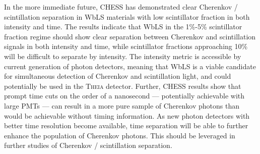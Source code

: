 In the more immediate future, CHESS has demonstrated clear Cherenkov / scintillation separation in WbLS materials with low scintillator fraction in both intensity and time. 
The results indicate that WbLS in the 1\%-5\% scintillator fraction regime should show clear separation between Cherenkov and scintillation signals in both intensity and time, while scintillator fractions approaching 10\% will be difficult to separate by intensity.
The intensity metric is accessible by current generation of photon detectors, meaning that WbLS is a viable candidate for simultaneous detection of Cherenkov and scintillation light, and could potentially be used in the \textsc{Theia} detector.
Further, CHESS results show that prompt time cuts on the order of a nanosecond --- potentially achievable with large PMTs --- can result in a more pure sample of Cherenkov photons than would be achievable without timing information.
As new photon detectors with better time resolution become available, time separation will be able to further enhance the population of Cherenkov photons.
This should be leveraged in further studies of Cherenkov / scintillation separation.
